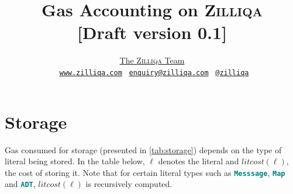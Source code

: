 \documentclass[9pt]{article}
\begin{document}
\title{\Huge{\textbf{Gas Accounting on \textsc{Zilliqa}}} \\ \small{[Draft version
0.1]}}

\author{
 	\href{https://www.zilliqa.com/team.html}{The \textsc{Zilliqa} Team} \\
    \Mundus~\href{https://www.zilliqa.com}{\texttt{www.zilliqa.com}}
\Letter~\href{mailto:enquiry@zilliqa.com}{\texttt{enquiry@zilliqa.com}}
\faTwitter~\href{https://twitter.com/zilliqa}{\texttt{@zilliqa}
}}


\maketitle

\section{Storage}

Gas consumed for storage (presented in \autoref{tab:storage}) depends on
the type of literal being stored. In the table below, $\ell$ denotes the
literal  and $litcost(\ell)$, the cost of storing it. Note that for certain
literal types such as \textbf{\texttt{\textcolor{teal}{Messsage}}},
\textbf{\texttt{\textcolor{teal}{Map}}} and
\textbf{\texttt{\textcolor{teal}{ADT}}}, $litcost(\ell)$ is recursively
computed. 
\end{document}
